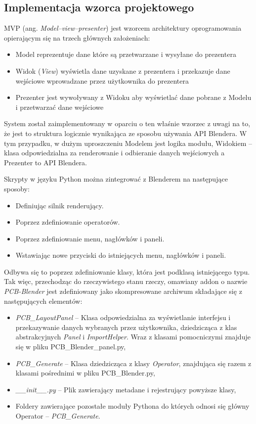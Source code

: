 \documentclass[brudnopis]{xmgr}
\begin{document}
\subsection{Implementacja wzorca projektowego} \label{mvp}
MVP (ang. \emph{Model–view–presenter}) jest wzorcem architektury oprogramowania opierającym się na trzech głównych założeniach:\cite{mvp}
\begin{itemize}
\item Model reprezentuje dane które są przetwarzane i wysyłane do prezentera
\item Widok (\emph{View}) wyświetla dane uzyskane z prezentera i przekazuje dane wejściowe wprowadzane przez użytkownika do prezentera
\item Prezenter jest wywoływany z Widoku aby wyświetlać dane pobrane z Modelu i przetwarzać dane wejściowe
\end{itemize}
System został zaimplementowany w oparciu o ten właśnie wzorzec z uwagi na to, że jest to struktura logicznie wynikająca ze sposobu używania API Blendera.
W tym przypadku, w dużym uproszczeniu Modelem jest logika modułu, Widokiem -- klasa odpowiedzialna za renderowanie i odbieranie danych wejściowych a Prezenter to API Blendera.
\newline


Skrypty w języku Python można zintegrować z Blenderem na następujące sposoby:
\begin{itemize}
\item Definiując silnik renderujący.
\item Poprzez zdefiniowanie operatorów.
\item Poprzez zdefiniowanie menu, nagłówków i paneli.
\item Wstawiając nowe przyciski do istniejących menu, nagłówków i paneli.
\end{itemize}

Odbywa się to poprzez zdefiniowanie klasy, która jest podklasą istniejącego typu.
Tak więc, przechodząc do rzeczywistego stanu rzeczy, omawiany addon o nazwie \emph{PCB-Blender} jest zdefiniowany jako skompresowane archiwum składające się z następujących elementów:
\begin{itemize}
\item \emph{PCB\_LayoutPanel} -- Klasa odpowiedzialna za wyświetlanie interfejsu i przekazywanie danych wybranych przez użytkownika, dziedzicząca z klas abstrakcyjnych \emph{Panel} i \emph{ImportHelper}. Wraz z klasami pomocniczymi znajduje się w pliku PCB\_Blender\_panel.py,
\item \emph{PCB\_Generate} -- Klasa dziedzicząca z klasy \emph{Operator}, znajdująca się razem z klasami pośrednimi w pliku PCB\_Blender.py,
\item \emph{\_\_init\_\_.py} -- Plik zawierający metadane i rejestrujący powyższe klasy,
\item Foldery zawierające pozostałe moduły Pythona do których odnosi się główny Operator -- \emph{PCB\_Generate}.
\end{itemize}
\end{document}
